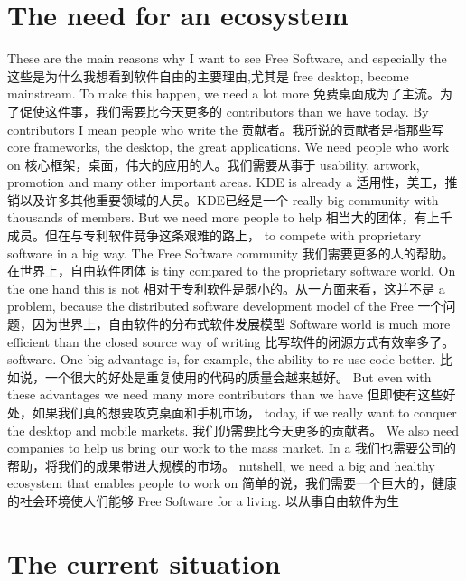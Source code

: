 \section*{The need for an ecosystem}
These are the main reasons why I want to see Free Software, and especially the
这些是为什么我想看到软件自由的主要理由,尤其是
free desktop, become mainstream. To make this happen, we need a lot more
免费桌面成为了主流。为了促使这件事，我们需要比今天更多的
contributors than we have today. By contributors I mean people who write the
贡献者。我所说的贡献者是指那些写
core frameworks, the desktop, the great applications. We need people who work on
核心框架，桌面，伟大的应用的人。我们需要从事于
usability, artwork, promotion and many other important areas. KDE is already a
适用性，美工，推销以及许多其他重要领域的人员。KDE已经是一个
really big community with thousands of members. But we need more people to help 
相当大的团体，有上千成员。但在与专利软件竞争这条艰难的路上，
to compete with proprietary software in a big way. The Free Software community
我们需要更多的人的帮助。在世界上，自由软件团体
is tiny compared to the proprietary software world. On the one hand this is not
相对于专利软件是弱小的。从一方面来看，这并不是
a problem, because the distributed software development model of the Free
一个问题，因为世界上，自由软件的分布式软件发展模型
Software world is much more efficient than the closed source way of writing
比写软件的闭源方式有效率多了。
software. One big advantage is, for example, the ability to re-use code better.
比如说，一个很大的好处是重复使用的代码的质量会越来越好。
But even with these advantages we need many more contributors than we have
但即使有这些好处，如果我们真的想要攻克桌面和手机市场，
today, if we really want to conquer the desktop and mobile markets.
我们仍需要比今天更多的贡献者。
We also need companies to help us bring our work to the mass market. In a
我们也需要公司的帮助，将我们的成果带进大规模的市场。
nutshell, we need a big and healthy ecosystem that enables people to work on
简单的说，我们需要一个巨大的，健康的社会环境使人们能够
Free Software for a living.
以从事自由软件为生
\section*{The current situation}
